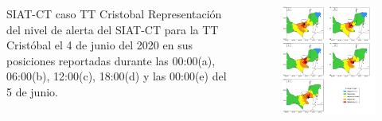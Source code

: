 \begin{frame}
\begin{columns}
    \begin{column}{0.35\textwidth}
        \begin{block}{SIAT-CT caso TT Cristobal}
        Representación del nivel de alerta del SIAT-CT para la TT Cristóbal el 4 de junio del 2020 en sus posiciones reportadas durante las 00:00(a), 06:00(b), 12:00(c), 18:00(d) y las 00:00(e) del 5 de junio.
        \end{block}
    \end{column}
    \begin{column}{0.65\textwidth}
    \begin{figure}
        \centering
        \includegraphics[scale = 0.18]{Images/Figures/Fig_1_3.jpeg}
        \label{fig:fig_3}
    \end{figure}
    \end{column}
\end{columns}
\end{frame}

